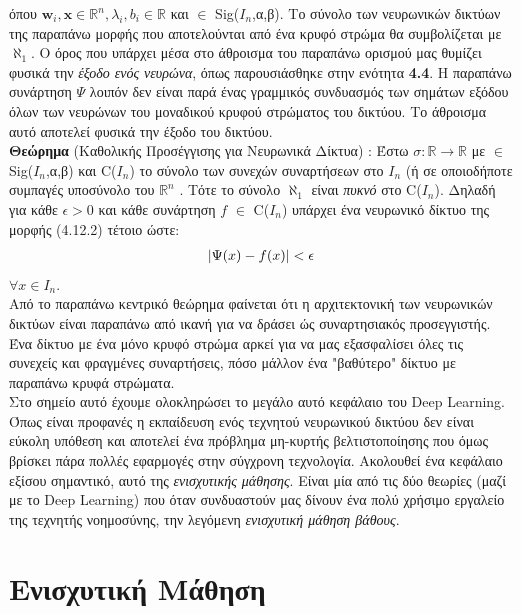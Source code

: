 \documentclass[11pt]{article} %
\numberwithin{equation}{subsection}
\begin{document}
όπου  $\textbf{w}_i,\textbf{x}  \in \mathbb{R}^n, \lambda_i,b_i \in \mathbb{R}$ και \sigma $\in$ Sig($I_n$,α,β). Το σύνολο των νευρωνικών δικτύων της παραπάνω μορφής που αποτελούνται από ένα κρυφό στρώμα θα συμβολίζεται με $\aleph_{1}$. Ο όρος που υπάρχει μέσα στο άθροισμα του παραπάνω ορισμού μας θυμίζει φυσικά την \textit{έξοδο ενός νευρώνα}, όπως παρουσιάσθηκε στην ενότητα \textbf{4.4}. Η παραπάνω συνάρτηση $\Psi$ λοιπόν δεν είναι παρά ένας γραμμικός συνδυασμός των σημάτων εξόδου όλων των νευρώνων του μοναδικού κρυφού στρώματος του δικτύου. Το άθροισμα αυτό αποτελεί φυσικά την έξοδο του δικτύου. \\

\textbf{Θεώρημα} (Καθολικής Προσέγγισης για Νευρωνικά Δίκτυα) \cite{uat}: Έστω $\sigma : \mathbb{R} \rightarrow \mathbb{R}$  με  \sigma  $\in$ Sig($I_n$,α,β) και C($I_n$) το σύνολο των συνεχών συναρτήσεων στο $Ι_n$ (ή σε οποιοδήποτε συμπαγές υποσύνολο του $\mathbb{R}^n$ . Τότε το σύνολο $\aleph_{1}$ είναι \textit{πυκνό} στο C($I_n$). Δηλαδή για κάθε $\epsilon > 0$ και κάθε συνάρτηση $f$ $\in$ C($I_n$) υπάρχει ένα νευρωνικό δίκτυο της μορφής (4.12.2) τέτοιο ώστε: \\
 \begin{align*}
\abs{\Psi(x) - f(x)} < \epsilon 
\end{align*}
$\forall x \in I_n$. \\

Από το παραπάνω κεντρικό θεώρημα φαίνεται ότι η αρχιτεκτονική των νευρωνικών δικτύων είναι παραπάνω από ικανή για να δράσει ώς συναρτησιακός προσεγγιστής. Ένα δίκτυο με ένα μόνο κρυφό στρώμα αρκεί για να μας εξασφαλίσει όλες τις συνεχείς και φραγμένες συναρτήσεις, πόσο μάλλον ένα "βαθύτερο" δίκτυο με παραπάνω κρυφά στρώματα. \\

Στο σημείο αυτό έχουμε ολοκληρώσει το μεγάλο αυτό κεφάλαιο του Deep Learning. Όπως είναι προφανές η εκπαίδευση ενός τεχνητού νευρωνικού δικτύου δεν είναι εύκολη υπόθεση και αποτελεί ένα πρόβλημα μη-κυρτής βελτιστοποίησης που όμως βρίσκει πάρα πολλές εφαρμογές στην σύγχρονη τεχνολογία. Ακολουθεί ένα κεφάλαιο εξίσου σημαντικό, αυτό της \textit{ενισχυτικής μάθησης}. Είναι μία από τις δύο θεωρίες (μαζί με το Deep Learning) που όταν συνδυαστούν μας δίνουν ένα πολύ χρήσιμο εργαλείο της τεχνητής νοημοσύνης, την λεγόμενη \textit{ενισχυτική μάθηση βάθους}.


\newpage

\section{Ενισχυτική Μάθηση}
\end{document}
